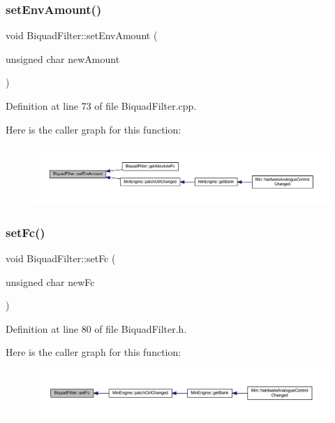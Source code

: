 \subsubsection{\texorpdfstring{set\+Env\+Amount()}{setEnvAmount()}}
{\footnotesize\ttfamily void Biquad\+Filter\+::set\+Env\+Amount (\begin{DoxyParamCaption}\item[{unsigned char}]{new\+Amount }\end{DoxyParamCaption})}



Definition at line 73 of file Biquad\+Filter.\+cpp.

Here is the caller graph for this function\+:
\nopagebreak
\begin{figure}[H]
\begin{center}
\leavevmode
\includegraphics[width=350pt]{class_biquad_filter_a5bc855d79f31804b2fa8c4b7ef2fba3d_icgraph}
\end{center}
\end{figure}
\mbox{\label{class_biquad_filter_a8622e15237db2ecd042a2efff133ece3}} 
\subsubsection{\texorpdfstring{set\+Fc()}{setFc()}}
{\footnotesize\ttfamily void Biquad\+Filter\+::set\+Fc (\begin{DoxyParamCaption}\item[{unsigned char}]{new\+Fc }\end{DoxyParamCaption})\hspace{0.3cm}{\ttfamily [inline]}}



Definition at line 80 of file Biquad\+Filter.\+h.

Here is the caller graph for this function\+:
\nopagebreak
\begin{figure}[H]
\begin{center}
\leavevmode
\includegraphics[width=350pt]{class_biquad_filter_a8622e15237db2ecd042a2efff133ece3_icgraph}
\end{center}
\end{figure}
\mbox{\label{class_biquad_filter_aa729bb052d8d58e3ee6b5121c2d05810}} 
